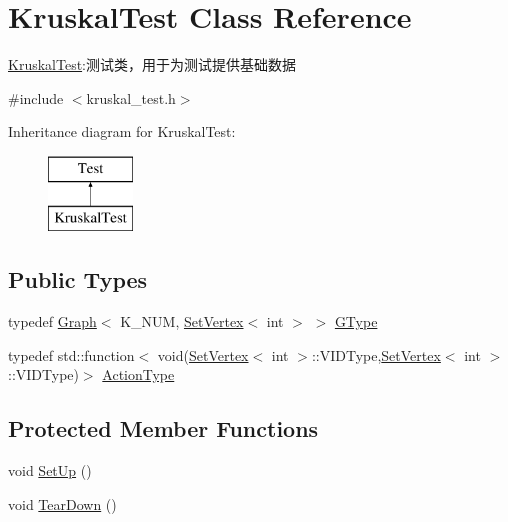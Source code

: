 \hypertarget{class_kruskal_test}{}\section{Kruskal\+Test Class Reference}
\label{class_kruskal_test}


\hyperlink{class_kruskal_test}{Kruskal\+Test}\+:测试类，用于为测试提供基础数据  




{\ttfamily \#include $<$kruskal\+\_\+test.\+h$>$}

Inheritance diagram for Kruskal\+Test\+:\begin{figure}[H]
\begin{center}
\leavevmode
\includegraphics[height=2.000000cm]{class_kruskal_test}
\end{center}
\end{figure}
\subsection*{Public Types}
\begin{DoxyCompactItemize}
\item 
typedef \hyperlink{struct_introduction_to_algorithm_1_1_graph_algorithm_1_1_graph}{Graph}$<$ K\+\_\+\+N\+U\+M, \hyperlink{struct_introduction_to_algorithm_1_1_graph_algorithm_1_1_set_vertex}{Set\+Vertex}$<$ int $>$ $>$ \hyperlink{class_kruskal_test_a4cf4187bb360392a6e5829dacdf6fd6c}{G\+Type}
\item 
typedef std\+::function$<$ void(\hyperlink{struct_introduction_to_algorithm_1_1_graph_algorithm_1_1_set_vertex}{Set\+Vertex}$<$ int $>$\+::V\+I\+D\+Type,\hyperlink{struct_introduction_to_algorithm_1_1_graph_algorithm_1_1_set_vertex}{Set\+Vertex}$<$ int $>$\+::V\+I\+D\+Type)$>$ \hyperlink{class_kruskal_test_aa93c0a0f0cb0efdaeb56ea76b6861bef}{Action\+Type}
\end{DoxyCompactItemize}
\subsection*{Protected Member Functions}
\begin{DoxyCompactItemize}
\item 
void \hyperlink{class_kruskal_test_a8dec8e2cc34987a27862ce70a4557a39}{Set\+Up} ()
\item 
void \hyperlink{class_kruskal_test_afd7bb087cf8a63329181fc7a34b81625}{Tear\+Down} ()
\end{DoxyCompactItemize}
